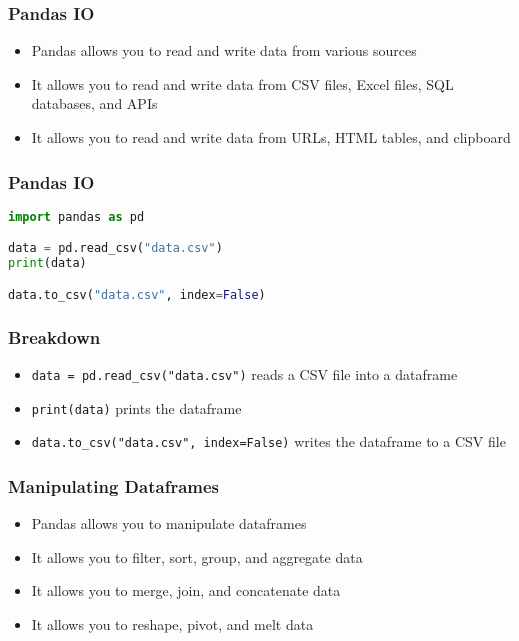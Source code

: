 \documentclass[serif, 9pt, aspectratio=32]{beamer}
\begin{document}
\begin{frame}
    \centering
    \frametitle{Pandas IO}
    \begin{itemize}
        \setlength{\itemsep}{2em}
        \item Pandas allows you to read and write data from various sources
        \item It allows you to read and write data from CSV files, Excel files, SQL databases, and APIs
        \item It allows you to read and write data from URLs, HTML tables, and clipboard
    \end{itemize}
\end{frame}

\begin{frame}[fragile]
    \frametitle{Pandas IO}
    \begin{lstlisting}[language=Python]
import pandas as pd

data = pd.read_csv("data.csv")
print(data)

data.to_csv("data.csv", index=False)
    \end{lstlisting}
\end{frame}

\begin{frame}
    \centering
    \frametitle{Breakdown}
    \begin{itemize}
        \setlength{\itemsep}{2em}
        \item \texttt{data = pd.read\_csv("data.csv")} reads a CSV file into a dataframe
        \item \texttt{print(data)} prints the dataframe
        \item \texttt{data.to\_csv("data.csv", index=False)} writes the dataframe to a CSV file
    \end{itemize}
\end{frame}

\begin{frame}
    \centering
    \frametitle{Manipulating Dataframes}
    \begin{itemize}
        \setlength{\itemsep}{2em}
        \item Pandas allows you to manipulate dataframes
        \item It allows you to filter, sort, group, and aggregate data
        \item It allows you to merge, join, and concatenate data
        \item It allows you to reshape, pivot, and melt data
    \end{itemize}
\end{frame}
\end{document}
